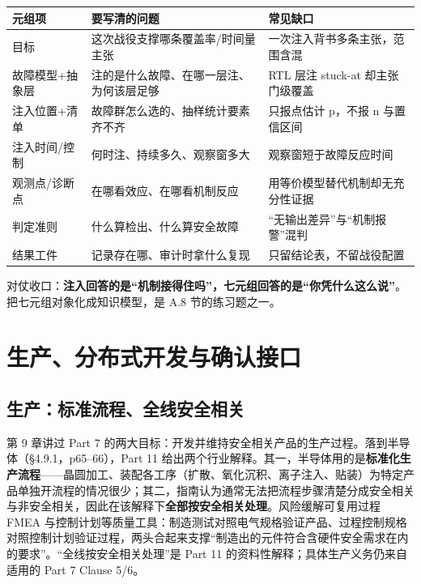\begin{center}
\begingroup\small
\setlength{\tabcolsep}{4pt}
\begin{tabularx}{\linewidth}{@{}XXX@{}}
\toprule
元组项 & 要写清的问题 & 常见缺口 \\
\midrule
目标 & 这次战役支撑哪条覆盖率/时间量主张 & 一次注入背书多条主张，范围含混 \\
故障模型+抽象层 & 注的是什么故障、在哪一层注、为何该层足够 & RTL 层注 stuck-at 却主张门级覆盖 \\
注入位置+清单 & 故障群怎么选的、抽样统计要素齐不齐 & 只报点估计 p，不报 n 与置信区间 \\
注入时间/控制 & 何时注、持续多久、观察窗多大 & 观察窗短于故障反应时间 \\
观测点/诊断点 & 在哪看效应、在哪看机制反应 & 用等价模型替代机制却无充分性证据 \\
判定准则 & 什么算检出、什么算安全故障 & “无输出差异”与“机制报警”混判 \\
结果工件 & 记录存在哪、审计时拿什么复现 & 只留结论表，不留战役配置 \\
\bottomrule
\end{tabularx}
\endgroup
\end{center}

对仗收口：\textbf{注入回答的是“机制接得住吗”，七元组回答的是“你凭什么这么说”}。把七元组对象化成知识模型，是 A.8 节的练习题之一。

\section{生产、分布式开发与确认接口}

\subsection{生产：标准流程、全线安全相关}

第 9 章讲过 Part 7 的两大目标：开发并维持安全相关产品的生产过程。落到半导体（§4.9.1，p65–66），Part 11 给出两个行业解释。其一，半导体用的是\textbf{标准化生产流程}——晶圆加工、装配各工序（扩散、氧化沉积、离子注入、贴装）为特定产品单独开流程的情况很少；其二，指南认为通常无法把流程步骤清楚分成安全相关与非安全相关，因此在该解释下\textbf{全部按安全相关处理}。风险缓解可复用过程 FMEA 与控制计划等质量工具：制造测试对照电气规格验证产品、过程控制规格对照控制计划验证过程，两头合起来支撑“制造出的元件符合含硬件安全需求在内的要求”。“全线按安全相关处理”是 Part 11 的资料性解释；具体生产义务仍来自适用的 Part 7 Clause 5/6。

